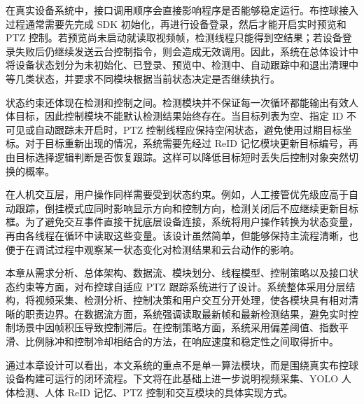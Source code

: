 在真实设备系统中，接口调用顺序会直接影响程序是否能够稳定运行。布控球接入过程通常需要先完成 SDK 初始化，再进行设备登录，然后才能开启实时预览和 PTZ 控制。若预览尚未启动就读取视频帧，检测线程只能得到空结果；若设备登录失败后仍继续发送云台控制指令，则会造成无效调用。因此，系统在总体设计中将设备状态划分为未初始化、已登录、预览中、检测中、自动跟踪中和退出清理中等几类状态，并要求不同模块根据当前状态决定是否继续执行。

状态约束还体现在检测和控制之间。检测模块并不保证每一次循环都能输出有效人体目标，因此控制模块不能默认检测结果始终存在。当目标列表为空、指定 ID 不可见或自动跟踪未开启时，PTZ 控制线程应保持空闲状态，避免使用过期目标坐标。对于目标重新出现的情况，系统需要先经过 ReID 记忆模块更新目标编号，再由目标选择逻辑判断是否恢复跟踪。这样可以降低目标短时丢失后控制对象突然切换的概率。

在人机交互层，用户操作同样需要受到状态约束。例如，人工接管优先级应高于自动跟踪，倒挂模式应同时影响显示方向和控制方向，检测关闭后不应继续更新目标框。为了避免交互事件直接干扰底层设备连接，系统将用户操作转换为状态变量，再由各线程在循环中读取这些变量。该设计虽然简单，但能够保持主流程清晰，也便于在调试过程中观察某一状态变化对检测结果和云台动作的影响。

本章从需求分析、总体架构、数据流、模块划分、线程模型、控制策略以及接口状态约束等方面，对布控球自适应 PTZ 跟踪系统进行了设计。系统整体采用分层结构，将视频采集、检测分析、控制决策和用户交互分开处理，使各模块具有相对清晰的职责边界。在数据流方面，系统强调读取最新帧和最新检测结果，避免实时控制场景中因帧积压导致控制滞后。在控制策略方面，系统采用偏差阈值、指数平滑、比例脉冲和控制冷却相结合的方法，在响应速度和稳定性之间取得折中。

通过本章设计可以看出，本文系统的重点不是单一算法模块，而是围绕真实布控球设备构建可运行的闭环流程。下文将在此基础上进一步说明视频采集、YOLO 人体检测、人体 ReID 记忆、PTZ 控制和交互模块的具体实现方式。
